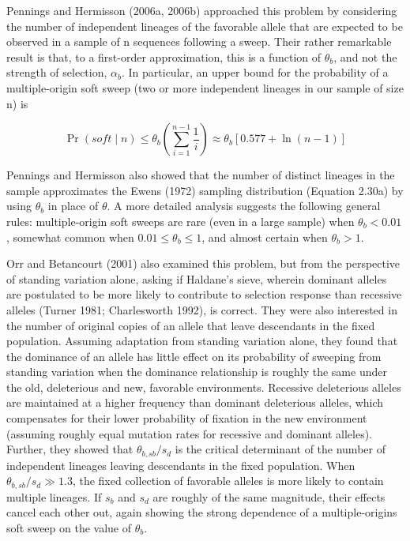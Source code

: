 \documentclass{article}
\begin{document}
Pennings and Hermisson (2006a, 2006b) approached this problem by considering the number of independent lineages of the favorable allele that are expected to be observed in a sample of n sequences following a sweep. Their rather remarkable result is that, to a first-order approximation, this is a function of  $ \theta_{b} $, and not the strength of selection,  $ \alpha_{b} $. In particular, an upper bound for the probability of a multiple-origin soft sweep (two or more independent lineages in our sample of size n) is

\begin{equation}
\Pr(soft\mid n)\leq\theta_{b}\left(\sum_{i=1}^{n-1}\frac{1}{i}\right)\approx\theta_{b}[0.577+\ln(n-1)]
\tag{8.21}
\label{eq:8_21}
\end{equation}

Pennings and Hermisson also showed that the number of distinct lineages in the sample approximates the Ewens (1972) sampling distribution (Equation 2.30a) by using  $ \theta_b $ in place of  $ \theta $. A more detailed analysis suggests the following general rules: multiple-origin soft sweeps are rare (even in a large sample) when  $ \theta_b < 0.01 $, somewhat common when  $ 0.01 \leq \theta_b \leq 1 $, and almost certain when  $ \theta_b > 1 $.

Orr and Betancourt (2001) also examined this problem, but from the perspective of standing variation alone, asking if Haldane's sieve, wherein dominant alleles are postulated to be more likely to contribute to selection response than recessive alleles (Turner 1981; Charlesworth 1992), is correct. They were also interested in the number of original copies of an allele that leave descendants in the fixed population. Assuming adaptation from standing variation alone, they found that the dominance of an allele has little effect on its probability of sweeping from standing variation when the dominance relationship is roughly the same under the old, deleterious and new, favorable environments. Recessive deleterious alleles are maintained at a higher frequency than dominant deleterious alleles, which compensates for their lower probability of fixation in the new environment (assuming roughly equal mutation rates for recessive and dominant alleles). Further, they showed that  $ \theta_{b,sb}/s_d $ is the critical determinant of the number of independent lineages leaving descendants in the fixed population. When  $ \theta_{b,sb}/s_d \gg 1.3 $, the fixed collection of favorable alleles is more likely to contain multiple lineages. If  $ s_b $ and  $ s_d $ are roughly of the same magnitude, their effects cancel each other out, again showing the strong dependence of a multiple-origins soft sweep on the value of  $ \theta_b $.
\end{document}
